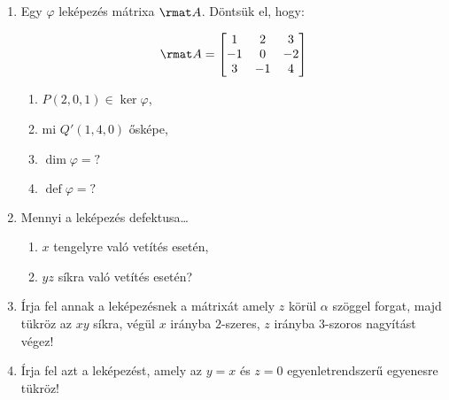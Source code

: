 \documentclass[a4paper, 12pt]{scrartcl}
\begin{document}
\begin{enumerate}
  \item Egy $\varphi$ leképezés mátrixa $\rmat A$. Döntsük el, hogy:\\[-2mm]
        \begin{minipage}[b]{.25\textwidth}
          $$
            \rmat A = \begin{bmatrix}
              1  & 2  & 3  \\
              -1 & 0  & -2 \\
              3  & -1 & 4  \\
            \end{bmatrix}
          $$
        \end{minipage}\hfill
        \begin{minipage}[c]{.35\textwidth}
          \begin{enumerate}
            \item $P(2,0,1) \in \ker \varphi$,
            \item mi $Q'(1,4,0)$ ősképe,
          \end{enumerate}
        \end{minipage}
        \begin{minipage}[c]{.3\textwidth}
          \begin{enumerate}
            \setcounter{enumii}{2}
            \item $\dim \varphi = ?$
            \item $\operatorname{def} \varphi = ?$
          \end{enumerate}
        \end{minipage}

  \item Mennyi a leképezés defektusa\dots
        \begin{multicols}{2}
          \begin{enumerate}
            \item $x$ tengelyre való vetítés esetén,
            \item $yz$ síkra való vetítés esetén?
          \end{enumerate}
        \end{multicols}

  \item Írja fel annak a leképezésnek a mátrixát amely $z$ körül $\alpha$
        szöggel forgat, majd tükröz az $xy$ síkra, végül $x$ irányba $2$-szeres,
        $z$ irányba $3$-szoros nagyítást végez!

  \item Írja fel azt a leképezést, amely az $y=x$ és $z=0$ egyenletrendszerű
        egyenesre tükröz!
\end{enumerate}
\end{document}
